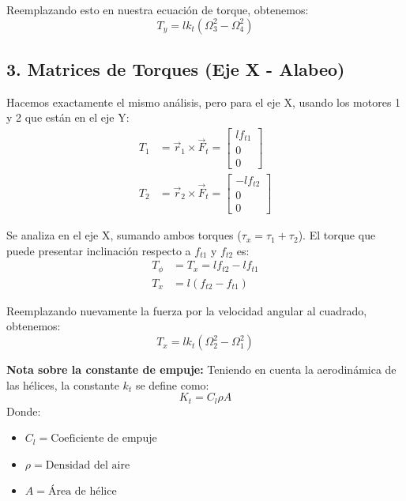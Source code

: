 \documentclass[11pt,a4paper]{article}
\begin{document}
Reemplazando esto en nuestra ecuación de torque, obtenemos:
\begin{equation*}
T_{y} = l k_{t} (\Omega_{3}^{2} - \Omega_{4}^{2})
\end{equation*}

\subsection*{3. Matrices de Torques (Eje X - Alabeo)}

Hacemos exactamente el mismo análisis, pero para el eje X, usando los motores 1 y 2 que están en el eje Y:
\begin{align*}
T_{1} &= \vec{r}_{1} \times \vec{F}_{t} = \begin{bmatrix} l f_{t1} \\ 0 \\ 0 \end{bmatrix} \\
T_{2} &= \vec{r}_{2} \times \vec{F}_{t} = \begin{bmatrix} -l f_{t2} \\ 0 \\ 0 \end{bmatrix}
\end{align*}

Se analiza en el eje X, sumando ambos torques ($\tau_{x} = \tau_{1} + \tau_{2}$). El torque que puede presentar inclinación respecto a $f_{t1}$ y $f_{t2}$ es:
\begin{align*}
T_{\phi} &= T_{x} = l f_{t2} - l f_{t1} \\
T_{x} &= l (f_{t2} - f_{t1})
\end{align*}

Reemplazando nuevamente la fuerza por la velocidad angular al cuadrado, obtenemos:
\begin{equation*}
T_{x} = l k_{t} (\Omega_{2}^{2} - \Omega_{1}^{2})
\end{equation*}

\vspace{0.5cm}
\textbf{Nota sobre la constante de empuje:} Teniendo en cuenta la aerodinámica de las hélices, la constante $k_t$ se define como:
\begin{equation*}
K_{t} = C_{l} \rho A
\end{equation*}
Donde:
\begin{itemize}
    \item $C_{l} = \text{Coeficiente de empuje}$
    \item $\rho = \text{Densidad del aire}$
    \item $A = \text{Área de hélice}$
\end{itemize}
\end{document}
